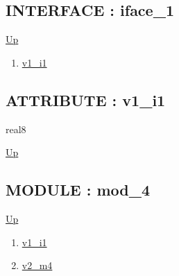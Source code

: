 \subsection*{INTERFACE : iface\_1}
\hypertarget{ecldoc:intest.in1intest.example_2.iface_1}{}
\par
\begin{minipage}[t]{\textwidth}
\begin{flushleft}
  
\end{flushleft}
\end{minipage}
\hyperlink{ecldoc:intest.in1intest.example_2}{Up} \\
\par
\par
\begin{enumerate}
\item \hyperlink{ecldoc:intest.in1intest.example_2.iface_1.v1_i1}{v1\_i1}
\end{enumerate}
\subsection*{ATTRIBUTE : v1\_i1}
\hypertarget{ecldoc:intest.in1intest.example_2.iface_1.v1_i1}{}
\par
\begin{minipage}[t]{\textwidth}
\begin{flushleft}
real8  
\end{flushleft}
\end{minipage}
\hyperlink{ecldoc:intest.in1intest.example_2.iface_1}{Up} \\
\par
\par

\subsection*{MODULE : mod\_4}
\hypertarget{ecldoc:intest.in1intest.example_2.mod_4}{}
\par
\begin{minipage}[t]{\textwidth}
\begin{flushleft}
  
\end{flushleft}
\end{minipage}
\hyperlink{ecldoc:intest.in1intest.example_2}{Up} \\
\par
\par
\begin{enumerate}
\item \hyperlink{ecldoc:intest.in1intest.example_2.mod_4.v1_i1}{v1\_i1}
\item \hyperlink{ecldoc:intest.in1intest.example_2.mod_4.v2_m4}{v2\_m4}
\end{enumerate}
